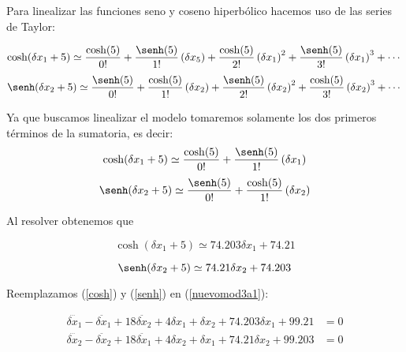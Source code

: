 \documentclass[letterpaper, 12pt]{article}
\begin{document}
\begin{enumerate}
\begin{enumerate}
Para linealizar las funciones seno y coseno hiperbólico hacemos uso de las series de Taylor: 

\begin{equation}
    \notag
    \cosh(\delta x_1 + 5)\simeq \frac{\cosh(5)}{0!}+\frac{\senh(5)}{1!}\left(\delta x_5\right)+\frac{\cosh(5)}{2!}\left(\delta x_1\right)^2+\frac{\senh(5)}{3!}\left(\delta x_1\right)^3+ \cdots
\end{equation}
\begin{equation}
    \notag
    \senh(\delta x_2 + 5)\simeq \frac{\senh(5)}{0!}+\frac{\cosh(5)}{1!}\left(\delta x_2\right)+\frac{\senh(5)}{2!}\left(\delta x_2\right)^2+\frac{\cosh(5)}{3!}\left(\delta x_2\right)^3+ \cdots
\end{equation}

Ya que buscamos linealizar el modelo tomaremos solamente los dos primeros términos de la sumatoria, es decir:
\begin{equation}
    \notag
    \cosh(\delta x_1 + 5)\simeq \frac{\cosh(5)}{0!}+\frac{\senh(5)}{1!}\left(\delta x_1\right)
\end{equation}
\begin{equation}
    \notag
    \senh(\delta x_2 + 5)\simeq \frac{\senh(5)}{0!}+\frac{\cosh(5)}{1!}\left(\delta x_2\right)
\end{equation}

Al resolver obtenemos que

\begin{equation}
    \cosh(\delta x_1 + 5)\simeq 74.203\delta x_1+74.21
    \label{cosh}
\end{equation}

\begin{equation}
    \senh(\delta x_2 + 5)\simeq 74.21\delta x_2+74.203
    \label{senh}
\end{equation}

Reemplazamos (\ref{cosh}) y (\ref{senh}) en (\ref{nuevomod3a1}):

\begin{equation}
\begin{split}
    \dddot{\delta x_1}-\ddot{\delta x_1}+18\ddot{\delta x_2}+4\delta x_1 +\delta x_2 +74.203\delta x_1+99.21 &= 0 \\ \dddot{\delta x_2}-\ddot{\delta x_2}+18\ddot{\delta x_1}+4\delta x_2 +\delta x_1 +74.21\delta x_2+99.203 &= 0 
\end{split}
\label{nuevomod3a1}
\end{equation}


\end{enumerate}
\end{enumerate}
\end{document}
